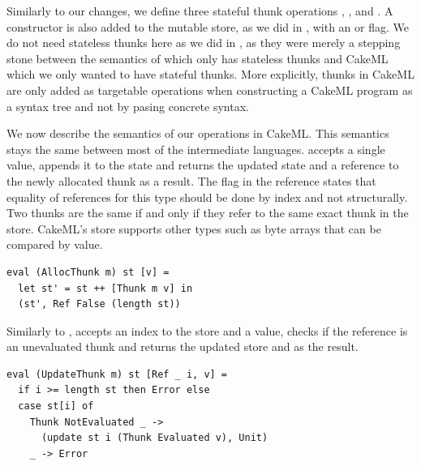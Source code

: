 Similarly to our \StateLang{} changes, we define three stateful thunk operations
, , and . A 
constructor is also added to the mutable store, as we did in \StateLang{}, with
an  or  flag. We do not need stateless
thunks here as we did in \StateLang{}, as they were merely a stepping stone
between the semantics of \EnvLang{} which only has stateless thunks and CakeML
which we only wanted to have stateful thunks. More explicitly, thunks in CakeML
are only added as targetable operations when constructing a CakeML program as a
syntax tree and not by pasing concrete syntax.

We now describe the semantics of our operations in CakeML. This semantics stays
the same between most of the intermediate languages.  accepts
a single value, appends it to the state and returns the updated state and a
reference to the newly allocated thunk as a result. The  flag in
the reference states that equality of references for this type should be done
by index and not structurally. Two thunks are the same if and only if they refer
to the same exact thunk in the store. CakeML's store supports other types such
as byte arrays that can be compared by value.
\begin{verbatim}
eval (AllocThunk m) st [v] =
  let st' = st ++ [Thunk m v] in
  (st', Ref False (length st))
\end{verbatim}
Similarly to \StateLang{},  accepts an index to the store and
a value, checks if the reference is an unevaluated thunk and returns the updated
store and  as the result.
\begin{verbatim}
eval (UpdateThunk m) st [Ref _ i, v] =
  if i >= length st then Error else
  case st[i] of
    Thunk NotEvaluated _ ->
      (update st i (Thunk Evaluated v), Unit)
    _ -> Error
\end{verbatim}

